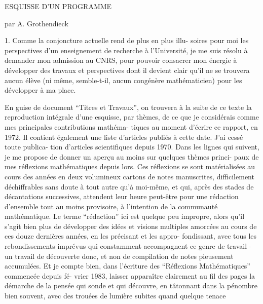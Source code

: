 
ESQUISSE D'UN PROGRAMME

par A. Grothendieck

1. Comme la conjoncture actuelle rend de plus en plus illu-%
soires pour moi les perspectives d'un enseignement de recherche à
l'Université, je me suis résolu à demander mon admission au CNRS, pour
pouvoir consacrer mon énergie à développer des travaux et perspectives
dont il devient clair qu'il ne se trouvera aucun élève (ni même,
semble-t-il, aucun congénère mathématicien) pour les développer à ma
place.

En guise de document ``Titres et Travaux'', on trouvera à la
suite de ce texte la reproduction intégrale d'une esquisse, par thèmes,
de ce que je considérais comme mes principales contributions mathéma-%
tiques au moment d'écrire ce rapport, en 1972. Il contient également
une liste d'articles publiés à cette date. J'ai cessé toute publica-%
tion d'articles scientifiques depuis 1970. Dans les lignes qui suivent,
je me propose de donner un aperçu au moins sur quelques thèmes princi-%
paux de mes réflexions mathématiques depuis lors. Ces réflexions se
sont matérialisées au cours des années en deux volumineux cartons de
notes manuscrites, difficilement déchiffrables sans doute à tout autre
qu'à moi-même, et qui, après des stades de décantations successives,
attendent leur heure peut-être pour une rédaction d'ensemble tout au
moins provisoire, à l'intention de la communauté mathématique. Le
terme ``rédaction'' ici est quelque peu impropre, alors qu'il s'agit
bien plus de développer des idées et visions multiples amorcées au
cours de ces douze dernières années, en les précisant et les appro-%
fondissant, avec tous les rebondissements imprévus qui constamment
accompagnent ce genre de travail - un travail de découverte donc, et
non de compilation de notes pieusement accumulées. Et je compte bien,
dans l'écriture des ``Réflexions Mathématiques'' commencée depuis fé-%
vrier 1983, laisser apparaître clairement au fil des pages la démarche
de la pensée qui sonde et qui découvre, en tâtonnant dans la pénombre
bien souvent, avec des trouées de lumière subites quand quelque tenace

